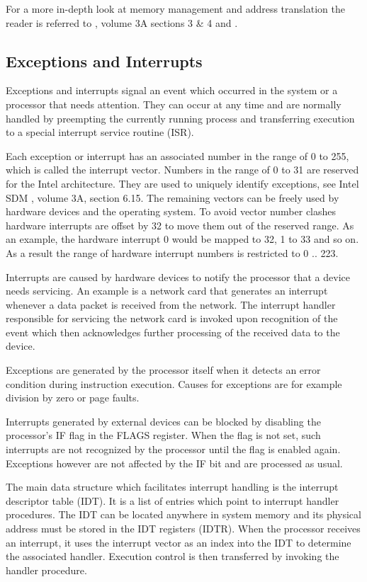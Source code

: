 For a more in-depth look at memory management and address translation the reader
is referred to \cite{IntelSDM}, volume 3A sections 3 \& 4 and
\cite{Drepper07whatevery}.

\subsection{Exceptions and Interrupts}\label{subsec:exceptions-interrupts}
Exceptions and interrupts signal an event
which occurred in the system or a processor that needs attention. They can
occur at any time and are normally handled by preempting the currently running
process and transferring execution to a special interrupt service routine
(ISR).

Each exception or interrupt has an associated number in the range of 0 to 255,
which is called the interrupt vector. Numbers in the
range of 0 to 31 are reserved for the Intel architecture. They are used to
uniquely identify exceptions, see Intel SDM \cite{IntelSDM}, volume 3A, section
6.15.  The remaining vectors can be freely used by hardware devices and the
operating system. To avoid vector number clashes hardware interrupts are offset
by 32 to move them out of the reserved range. As an example, the hardware
interrupt 0 would be mapped to 32, 1 to 33 and so on. As a result the range of
hardware interrupt numbers is restricted to 0 .. 223.

Interrupts are caused by hardware devices to notify the processor
that a device needs servicing. An example is a network card that generates an
interrupt whenever a data packet is received from the network. The interrupt
handler responsible for servicing the network card is invoked upon recognition
of the event which then acknowledges further processing of the received data to
the device.

Exceptions are generated by the processor itself when it detects an error
condition during instruction execution. Causes for exceptions are for example
division by zero or page faults.

Interrupts generated by external devices can be blocked by disabling the
processor's IF flag in the FLAGS register. When the flag
is not set, such interrupts are not recognized by the processor until the flag
is enabled again.  Exceptions however are not affected by the IF bit and are
processed as usual.

The main data structure which facilitates interrupt handling is the interrupt
descriptor table (IDT). It is a list of entries which point to
interrupt handler procedures. The IDT can be located anywhere in system memory
and its physical address must be stored in the IDT registers
(IDTR). When the processor receives an interrupt, it uses the
interrupt vector as an index into the IDT to determine the associated handler.
Execution control is then transferred by invoking the handler procedure.

